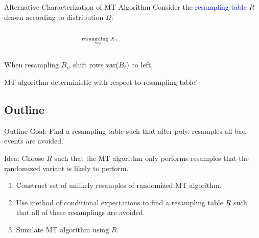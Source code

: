 \documentclass{beamer}
\def\padding{\vspace{0.5cm}}
\def\spadding{\vspace{0.25cm}}
\def\b{\textcolor{blue}}
\begin{document}
\begin{frame}{Alternative Characterization of MT Algorithm}
Consider the \b{resampling table} $R$ drawn according to distribution $\Omega$:\spadding

\begin{columns}
\begin{column}{.2\textwidth}
\pause
\end{column}\pause
\begin{column}{.2\textwidth}
\flushright $\overset{\text{resampling $X_1$}}{\rightsquigarrow\hspace{0.5em}}$
\end{column}
\begin{column}{.3\textwidth}
\hspace{-2em}
\end{column}
\end{columns}\pause

When resampling $B_i$, shift rows $\mathrm{var}(B_i)$ to left.\pause\padding

\follows MT algorithm deterministic with respect to resampling table!
\end{frame}

\subsection{Outline}
\begin{frame}{Outline}
    Goal: Find a resampling table such that after poly. resamples all bad-events are avoided.\spadding
    
    Idea: Choose $R$ such that the MT algorithm only performs resamples that the randomized variant is likely to perform.\pause\padding
    
    \begin{enumerate}
        \item Construct set of unlikely resamples of randomized MT algorithm.\pause
        \item Use method of conditional expectations to find a resampling table $R$ such that all of these resamplings are avoided.\pause
        \item Simulate MT algorithm using $R$.
    \end{enumerate}
\end{frame}
\end{document}
